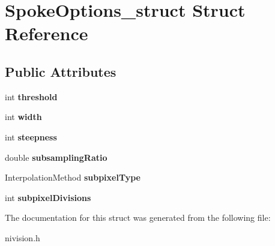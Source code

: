 \hypertarget{structSpokeOptions__struct}{\section{\-Spoke\-Options\-\_\-struct \-Struct \-Reference}
\label{structSpokeOptions__struct}
}
\subsection*{\-Public \-Attributes}
\begin{DoxyCompactItemize}
\item 
\hypertarget{structSpokeOptions__struct_afa43e8d1332461c5c53342bc57f9c538}{int {\bfseries threshold}}\label{structSpokeOptions__struct_afa43e8d1332461c5c53342bc57f9c538}

\item 
\hypertarget{structSpokeOptions__struct_a9224feb425787346f3bc215f56c457f1}{int {\bfseries width}}\label{structSpokeOptions__struct_a9224feb425787346f3bc215f56c457f1}

\item 
\hypertarget{structSpokeOptions__struct_a23480b55a4e97a800ae0507630a15cb0}{int {\bfseries steepness}}\label{structSpokeOptions__struct_a23480b55a4e97a800ae0507630a15cb0}

\item 
\hypertarget{structSpokeOptions__struct_a882945dd8cf0972460f3281868f80ad2}{double {\bfseries subsampling\-Ratio}}\label{structSpokeOptions__struct_a882945dd8cf0972460f3281868f80ad2}

\item 
\hypertarget{structSpokeOptions__struct_ab430f91134183cccb1157a245c1921c0}{\-Interpolation\-Method {\bfseries subpixel\-Type}}\label{structSpokeOptions__struct_ab430f91134183cccb1157a245c1921c0}

\item 
\hypertarget{structSpokeOptions__struct_a36e0fd5eee4a0bba2decce39a68d089a}{int {\bfseries subpixel\-Divisions}}\label{structSpokeOptions__struct_a36e0fd5eee4a0bba2decce39a68d089a}

\end{DoxyCompactItemize}


\-The documentation for this struct was generated from the following file\-:\begin{DoxyCompactItemize}
\item 
nivision.\-h\end{DoxyCompactItemize}
